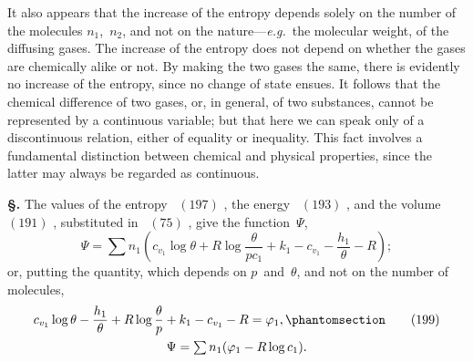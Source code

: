 \documentclass[12pt]{book}[2005/09/16]
\newcommand{\Chg}[2]{#2}
\newcommand{\Add}[1]{\Chg{}{#1}}
\newcommand{\Section}[1]{
  \medskip\par\textbf{§\;#1}
  \label{section:#1}
}
\newcommand{\Tag}[1]{%
  \phantomsection\label{eqn:#1}\tag*{\ensuremath{#1}}%
}
\newcommand{\Eq}[1]{%
  \hyperref[eqn:#1]{\ensuremath{#1}}%
}
\newcommand{\PageSep}[1]{\ignorespaces}
\newcommand{\eg}{\emph{e.g.}}
\newcommand{\tsum}{\mathop{\textstyle\sum}\limits}
\begin{document}
It also appears that the increase of the entropy depends
solely on the number of the molecules $n_{1}$,~$n_{2}$, and not on
the nature---\eg\ the molecular weight, of the diffusing gases.
The increase of the entropy does not depend on whether the
gases are chemically alike or not. By making the two
gases the same, there is evidently no increase of the entropy,
%
since no change of state ensues. It follows that the chemical
difference of two gases, or, in general, of two substances,
cannot be represented by a continuous variable; but that
\PageSep{215}
here we can speak only of a discontinuous relation, either
of equality or inequality. This fact involves a fundamental
distinction between chemical and physical properties, since
the latter may always be regarded as continuous.

\Section{239.} The values of the entropy~\Eq{(197)}, the energy~\Eq{(193)},
and the volume~\Eq{(191)}, substituted in~\Eq{(75)}, give the
function~$\Psi$,
\[
\Psi = \tsum n_{1} (c_{v_{1}} \log \theta + R \log \frac{\theta}{pc_{1}} + k_{1} - c_{v_{1}} - \frac{h_{1}}{\theta} - R);
\]
or, putting the quantity, which depends on $p$~and~$\theta$, and
not on the number of molecules,
\begin{gather*}
c_{v_{1}} \log \theta - \frac{h_{1}}{\theta} + R \log \frac{\theta}{p} + k_{1} - c_{v_{1}} - R = \varphi_{1},
\Tag{(199)} \\
\Psi = \tsum n_{1} (\varphi_{1} - R \log c_{1})\Add{.}
\end{gather*}
\end{document}
